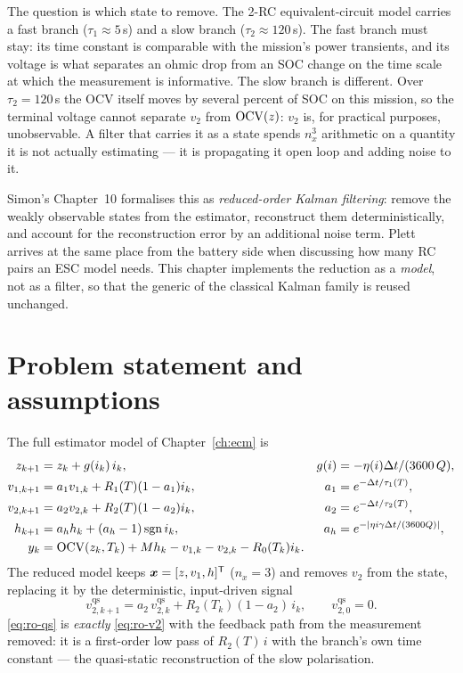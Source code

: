 The question is which state to remove.  The 2-RC equivalent-circuit model
\cite{plett2004ekf2,plett2016bms2} carries a fast branch ($\tau_1\approx5$\,s) and a slow branch
($\tau_2\approx120$\,s).  The fast branch must stay: its time constant is comparable with the
mission's power transients, and its voltage is what separates an ohmic drop from an SOC change on
the time scale at which the measurement is informative.  The slow branch is different.  Over
$\tau_2=120$\,s the OCV itself moves by several percent of SOC on this mission, so the terminal
voltage cannot separate $v_2$ from $\mathrm{OCV}(z)$: $v_2$ is, for practical purposes, unobservable.
A filter that carries it as a state spends $n_x^3$ arithmetic on a quantity it is not actually
estimating --- it is propagating it open loop and adding noise to it.

Simon's Chapter~10 \cite[Ch.~10]{simon2006} formalises this as \emph{reduced-order Kalman
filtering}: remove the weakly observable states from the estimator, reconstruct them
deterministically, and account for the reconstruction error by an additional noise term.  Plett
\cite[\S3]{plett2016bms2} arrives at the same place from the battery side when discussing how many
RC pairs an ESC model needs.  This chapter implements the reduction as a \emph{model}, not as a
filter, so that the generic  of the classical Kalman family is reused unchanged.

\section{Problem statement and assumptions}
The full estimator model of Chapter~\ref{ch:ecm} is
\begin{align}
z_{k+1}&=z_k+g(i_k)\,i_k, & g(i)&=-\eta(i)\Delta t/(3600\,Q), \label{eq:ro-z}\\
v_{1,k+1}&=a_1 v_{1,k}+R_1(T)(1-a_1)i_k, & a_1&=e^{-\Delta t/\tau_1(T)}, \label{eq:ro-v1}\\
v_{2,k+1}&=a_2 v_{2,k}+R_2(T)(1-a_2)i_k, & a_2&=e^{-\Delta t/\tau_2(T)}, \label{eq:ro-v2}\\
h_{k+1}&=a_h h_k+(a_h-1)\operatorname{sgn} i_k, & a_h&=e^{-|\eta i\gamma\Delta t/(3600 Q)|}, \label{eq:ro-h}\\
y_k&=\mathrm{OCV}(z_k,T_k)+M h_k-v_{1,k}-v_{2,k}-R_0(T_k)i_k. & & \label{eq:ro-y}
\end{align}
The reduced model keeps $\bm{x}=[z,v_1,h]^{\mathsf{T}}$ ($n_x=3$) and removes $v_2$ from the state, replacing
it by the deterministic, input-driven signal
\begin{equation}
\boxed{\;v^{\mathrm{qs}}_{2,k+1}=a_2\,v^{\mathrm{qs}}_{2,k}+R_2(T_k)(1-a_2)\,i_k,
\qquad v^{\mathrm{qs}}_{2,0}=0.\;}
\label{eq:ro-qs}
\end{equation}
\eqref{eq:ro-qs} is \emph{exactly} \eqref{eq:ro-v2} with the feedback path from the measurement
removed: it is a first-order low pass of $R_2(T)\,i$ with the branch's own time constant --- the
quasi-static reconstruction of the slow polarisation.

